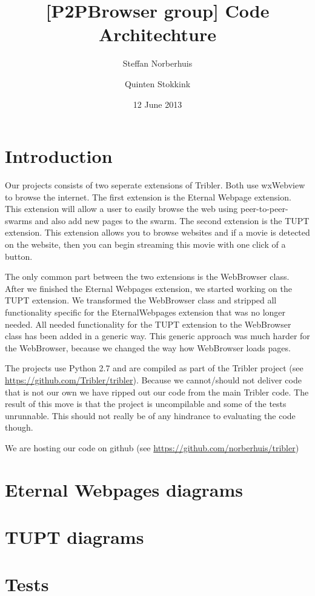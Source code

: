 \documentclass[a4paper,11pt]{article}
\title{[P2PBrowser group] Code Architechture}
\author{Steffan Norberhuis \and Quinten Stokkink}
\date{12 June 2013}
\begin{document}
   \maketitle

\section{Introduction}
Our projects consists of two seperate extensions of Tribler. Both use wxWebview to browse the internet.
The first extension is the Eternal Webpage extension.
This extension will allow a user to easily browse the web using peer-to-peer-swarms and also add new pages to the swarm.
The second extension is the TUPT extension.
This extension allows you to browse websites and if a movie is detected on the website,
then you can begin streaming this movie with one click of a button.

The only common part between the two extensions is the WebBrowser class.
After we finished the Eternal Webpages extension, we started working on the TUPT extension.
We transformed the WebBrowser class and stripped all functionality specific for the EternalWebpages extension that was no longer needed.
All needed functionality for the TUPT extension to the WebBrowser class has been added in a generic way.
This generic approach was much harder for the WebBrowser, because we changed the way how WebBrowser loads pages.

The projects use Python 2.7 and are compiled as part of the Tribler project (see \url{https://github.com/Tribler/tribler}).
Because we cannot/should not deliver code that is not our own we have ripped out our code
from the main Tribler code. The result of this move is that the project is uncompilable and 
some of the tests unrunnable. This should not really be of any hindrance to evaluating the code though.

We are hosting our code on github (see \url{https://github.com/norberhuis/tribler})

\section{Eternal Webpages diagrams}


\section{TUPT diagrams}


\section{Tests}

\end{document}

